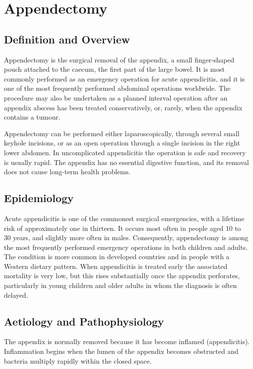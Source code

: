 \chapter{Appendectomy}

\section*{Definition and Overview}
Appendectomy is the surgical removal of the appendix, a small finger-shaped pouch attached to the caecum, the first part of the large bowel. It is most commonly performed as an emergency operation for acute appendicitis, and it is one of the most frequently performed abdominal operations worldwide. The procedure may also be undertaken as a planned interval operation after an appendix abscess has been treated conservatively, or, rarely, when the appendix contains a tumour.

Appendectomy can be performed either laparoscopically, through several small keyhole incisions, or as an open operation through a single incision in the right lower abdomen. In uncomplicated appendicitis the operation is safe and recovery is usually rapid. The appendix has no essential digestive function, and its removal does not cause long-term health problems.

\section*{Epidemiology}
Acute appendicitis is one of the commonest surgical emergencies, with a lifetime risk of approximately one in thirteen. It occurs most often in people aged 10 to 30 years, and slightly more often in males. Consequently, appendectomy is among the most frequently performed emergency operations in both children and adults. The condition is more common in developed countries and in people with a Western dietary pattern. When appendicitis is treated early the associated mortality is very low, but this rises substantially once the appendix perforates, particularly in young children and older adults in whom the diagnosis is often delayed.

\section*{Aetiology and Pathophysiology}
The appendix is normally removed because it has become inflamed (appendicitis). Inflammation begins when the lumen of the appendix becomes obstructed and bacteria multiply rapidly within the closed space.

